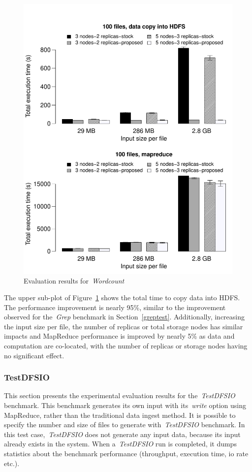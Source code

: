 \documentclass[preprint,12pt]{elsarticle}
\begin{document}
\begin{figure}[!htbp]
\centering
\includegraphics[width=\columnwidth, keepaspectratio]{result2.pdf}
\caption{Evaluation results for~\textit{Wordcount}}
\label{wordcountres}
\end{figure}


The upper sub-plot of Figure~\ref{wordcountres} shows the total time to copy data into HDFS.
The performance improvement is nearly 95\%, similar to the improvement observed for
the~\textit{Grep} benchmark in Section~\ref{greptest}. Additionally, increasing the
input size per file, the number of replicas or total storage nodes has similar impacts
and MapReduce performance is improved by nearly 5\% as data and computation are co-located,
with the number of replicas or storage nodes having no significant effect.

\subsubsection{TestDFSIO}
This section presents the experimental evaluation results for the~\textit{TestDFSIO}
benchmark. This benchmark generates its own input with its~\textit{write} option using
MapReduce, rather than the traditional data ingest method. It is possible to specify
the number and size of files to generate with~\textit{TestDFSIO} benchmark. In this test
case,~\textit{TestDFSIO} does not generate any input data, because its input already exists
in the system. When a~\textit{TestDFSIO} run is completed, it dumps statistics about the
benchmark performance (throughput, execution time, io rate etc.).
\end{document}
